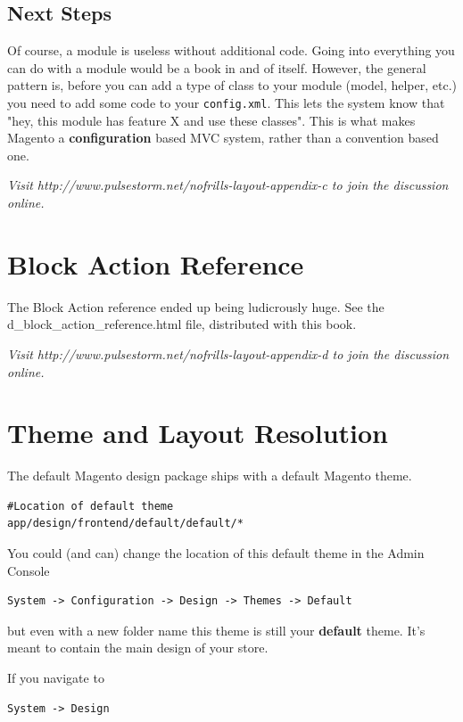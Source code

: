 \documentclass[oneside]{book}
\begin{document}
\section{Next Steps}

Of course, a module is useless without additional code. Going into everything you can do with a module would be a book in and of itself.  However, the general pattern is, before you can add a type of class to your module (model, helper, etc.) you need to add some code to your \footnotesize\texttt{config.xml}\normalsize.  This lets the system know that "hey, this module has feature X and use these classes".  This is what makes Magento a \textbf{configuration} based MVC system, rather than a convention based one.

\emph{Visit http://www.pulsestorm.net/nofrills-layout-appendix-c to join the discussion online.}
\chapter{Block Action Reference}
The Block Action reference ended up being ludicrously huge.  See the  d\_block\_action\_reference.html file, distributed with this book.

\emph{Visit http://www.pulsestorm.net/nofrills-layout-appendix-d to join the discussion online.}
\chapter{Theme and Layout Resolution}
The default Magento design package ships with a default Magento theme.

\begin{lstlisting}
#Location of default theme
app/design/frontend/default/default/*

\end{lstlisting}


You could (and can) change the location of this default theme in the Admin Console

\begin{lstlisting}
System -> Configuration -> Design -> Themes -> Default

\end{lstlisting}


but even with a new folder name this theme is still your \textbf{default} theme.  It's meant to contain the main design of your store.

If you navigate to

\begin{lstlisting}
System -> Design

\end{lstlisting}
\end{document}

